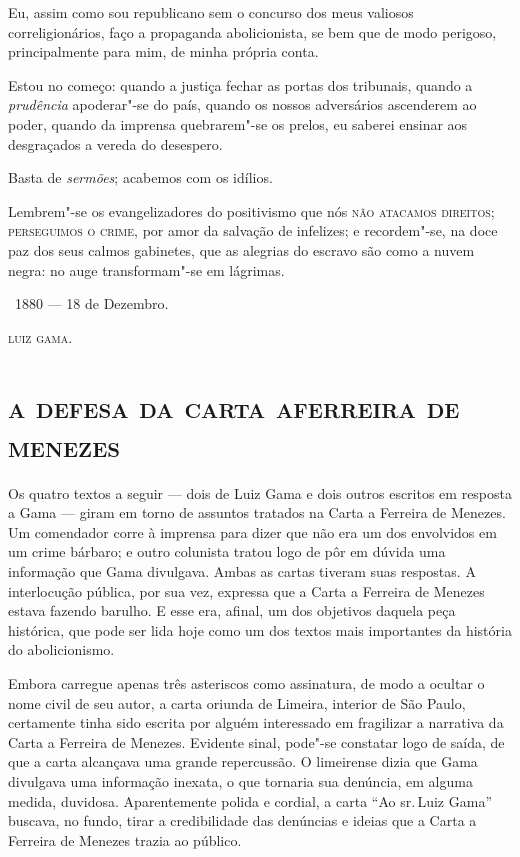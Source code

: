 Eu, assim como sou republicano sem o concurso dos meus valiosos
correligionários, faço a propaganda abolicionista, se bem que de modo
perigoso, principalmente para mim, de minha própria conta.

Estou no começo: quando a justiça fechar as portas dos tribunais, quando
a \emph{prudência} apoderar"-se do país, quando os nossos adversários
ascenderem ao poder, quando da imprensa quebrarem"-se os prelos, eu
saberei ensinar aos desgraçados a vereda do desespero.

Basta de \emph{sermões}; acabemos com os idílios.

Lembrem"-se os evangelizadores do positivismo que nós \textsc{não atacamos
direitos; perseguimos o crime}, por amor da salvação de infelizes; e
recordem"-se, na doce paz dos seus calmos gabinetes, que as alegrias do
escravo são como a nuvem negra: no auge transformam"-se em lágrimas.

\bigskip

\hfill\ 1880 --- 18 de Dezembro.\medskip


\hfill\textsc{luiz gama.}



\begingroup\makeatletter\@openrightfalse
\part[a defesa da carta a ferreira de menezes]{\textsc{a defesa da carta a\break ferreira de menezes}}

\pagebreak
\mbox{}\vfill
\thispagestyle{empty}

{\small\noindent
Os quatro textos a seguir --- dois de Luiz Gama e dois outros
escritos em resposta a Gama --- giram em torno de assuntos tratados na
Carta a Ferreira de Menezes. Um comendador corre à imprensa para dizer
que não era um dos envolvidos em um crime bárbaro; e outro colunista
tratou logo de pôr em dúvida uma informação que Gama divulgava. Ambas as
cartas tiveram suas respostas. A interlocução pública, por sua vez,
expressa que a Carta a Ferreira de Menezes estava fazendo barulho. E
esse era, afinal, um dos objetivos daquela peça histórica, que pode ser
lida hoje como um dos textos mais importantes da história do
abolicionismo.}
\@openrighttrue\makeatother\endgroup

\paginabranca
\mbox{}\vfill
\thispagestyle{empty}

{\small\noindent
Embora carregue apenas três asteriscos como assinatura, de modo a
ocultar o nome civil de seu autor, a carta oriunda de Limeira, interior
de São Paulo, certamente tinha sido escrita por alguém interessado em
fragilizar a narrativa da Carta a Ferreira de Menezes. Evidente sinal,
pode"-se constatar logo de saída, de que a carta alcançava uma grande
repercussão. O limeirense dizia que Gama divulgava uma informação
inexata, o que tornaria sua denúncia, em alguma medida, duvidosa.
Aparentemente polida e cordial, a carta ``Ao sr.\,Luiz Gama'' buscava, no
fundo, tirar a credibilidade das denúncias e ideias que a Carta a
Ferreira de Menezes trazia ao público. }


